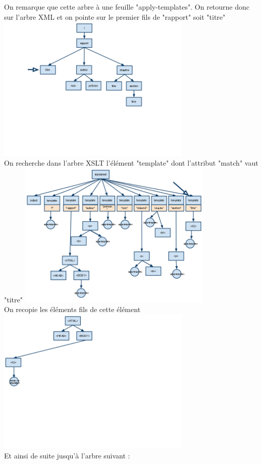 	On remarque que cette arbre à une feuille "apply-templates". On retourne donc sur l'arbre XML et on pointe sur le premier fils de "rapport" soit "titre"
	\includegraphics[width=0.7\textwidth]{img/XMLb}\\
	On recherche dans l'arbre XSLT l'élément "template" dont l'attribut "match" vaut "titre"
	\includegraphics[width=0.7\textwidth]{img/XSLTb}\\
	On recopie les éléments fils de cette élément 
	\includegraphics[width=0.7\textwidth]{img/HTMLb}\\
	Et ainsi de suite jusqu'à l'arbre suivant : 
